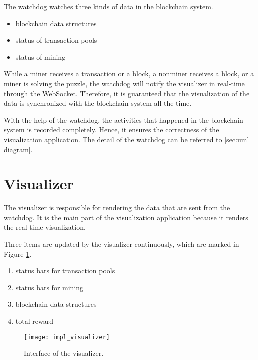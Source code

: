 The watchdog watches three kinds of data in the blockchain system.

\begin{itemize}
    \item blockchain data structures
    \item status of transaction pools
    \item status of mining
\end{itemize}

While a miner receives a transaction or a block, a nonminer receives a block, or a miner is solving the puzzle, the watchdog will notify the visualizer in real-time through the WebSocket. Therefore, it is guaranteed that the visualization of the data is synchronized with the blockchain system all the time.

With the help of the watchdog, the activities that happened in the blockchain system is recorded completely. Hence, it ensures the correctness of the visualization application. The detail of the watchdog can be referred to \ref{sec:uml diagram}.

\section{Visualizer}

The visualizer is responsible for rendering the data that are sent from the watchdog. It is the main part of the visualization application because it renders the real-time visualization. 

Three items are updated by the visualizer continuously, which are marked in Figure \ref{fig:interface of the visualizer}.


\begin{enumerate}
    \item status bars for transaction pools
    \item status bars for mining
    \item blockchain data structures
    \item total reward
\end{enumerate}

\begin{figure}[htb]
    \centering
    \texttt{[image: impl\_visualizer]}
    \caption{Interface of the visualizer.}
    \label{fig:interface of the visualizer}
\end{figure}


